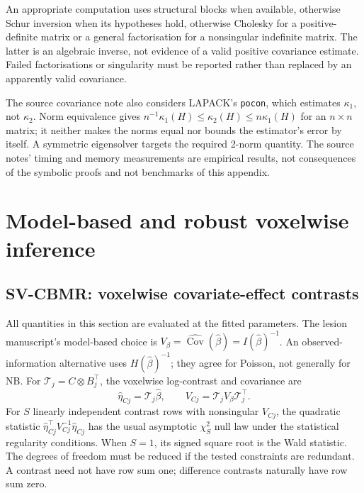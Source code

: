 \documentclass[11pt,a4paper]{article}
\newcommand{\Cov}{\operatorname{Cov}}
\numberwithin{equation}{section}
\begin{document}
An appropriate computation uses structural blocks when available, otherwise
Schur inversion when its hypotheses hold, otherwise Cholesky for a
positive-definite matrix or a general factorisation for a nonsingular
indefinite matrix. The latter is an algebraic inverse, not evidence of a valid
positive covariance estimate. Failed factorisations or singularity must be
reported rather than replaced by an apparently valid covariance.

The source covariance note also considers LAPACK's \texttt{pocon}, which
estimates $\kappa_1$, not $\kappa_2$. Norm equivalence gives
$n^{-1}\kappa_1(H)\leq\kappa_2(H)\leq n\kappa_1(H)$ for an $n\times n$
matrix; it neither makes the norms equal nor bounds the estimator's error
by itself. A symmetric eigensolver targets the required 2-norm quantity.
The source notes' timing and memory measurements are empirical results,
not consequences of the symbolic proofs and not benchmarks of this appendix.

\section{Model-based and robust voxelwise inference}\label{sec:inference}

\subsection{SV-CBMR: voxelwise covariate-effect contrasts}
All quantities in this section are evaluated at the fitted parameters.
The lesion manuscript's model-based choice is
$V_\beta=\widehat{\Cov}(\widehat\beta)=I(\widehat\beta)^{-1}$.
An observed-information alternative uses $H(\widehat\beta)^{-1}$; they agree
for Poisson, not generally for NB.
For $\mathcal T_j=C\otimes B_j^\top$, the voxelwise log-contrast and covariance are
\begin{equation}\label{eq:contrast}
 \widehat\eta_{Cj}=\mathcal T_j\widehat\beta,\qquad
 V_{Cj}=\mathcal T_jV_\beta\mathcal T_j^\top.
\end{equation}
For $S$ linearly independent contrast rows with nonsingular $V_{Cj}$, the
quadratic statistic
$\widehat\eta_{Cj}^\top V_{Cj}^{-1}\widehat\eta_{Cj}$
has the usual asymptotic $\chi^2_S$ null law under the statistical regularity
conditions. When $S=1$, its signed square root is the Wald statistic.
The degrees of freedom must be reduced if the tested constraints are
redundant. A contrast need not have row sum one; difference contrasts
naturally have row sum zero.
\end{document}
